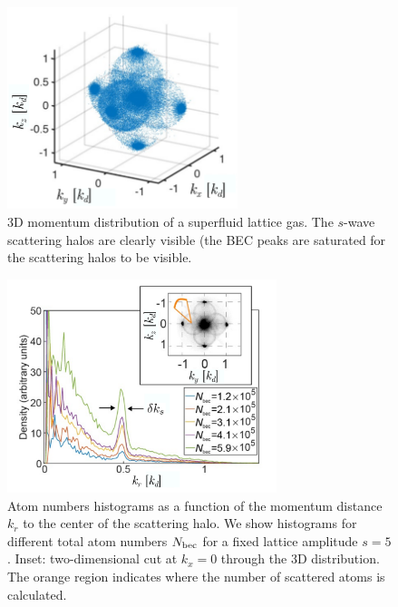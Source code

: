 \begin{figure}
    \centering
    \includegraphics[width=0.6\textwidth]{Fig/Chapter3/spheres.png}
    \caption[Scattering halos in the 3D momentum distribution of a superfluid lattice gas]{3D momentum distribution of a superfluid lattice gas. The $s$-wave scattering halos are clearly visible (the BEC peaks are saturated for the scattering halos to be visible.}
    \label{fig:spheres}
\end{figure}

\begin{figure}
    \centering
    \includegraphics[width=0.7\textwidth]{Fig/Chapter3/sphere_profiles.png}
    \caption[Atom numbers histograms as a function of the momentum distance $k_r$ to the center of the scattering halo]{Atom numbers histograms as a function of the momentum distance $k_r$ to the center of the scattering halo. We show histograms for different total atom numbers $N_{\rm{bec}}$ for a fixed lattice amplitude $s=5$. Inset: two-dimensional cut at $k_x=0$ through the 3D distribution. The orange region indicates where the number of scattered atoms is calculated.}
    \label{fig:sphere_profiles}
\end{figure}

